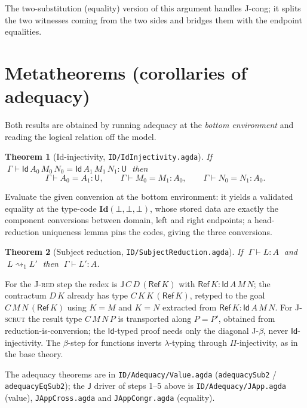 \documentclass[11pt]{article}
\newtheorem{theorem}{Theorem}
\newcommand{\ty}[3]{#1 \vdash #2 : #3}
\newcommand{\cv}[4]{#1 \vdash #2 = #3 : #4}
\newcommand{\U}{\mathsf{U}}
\newcommand{\Id}{\mathsf{Id}}
\newcommand{\Rf}{\mathsf{Ref}}
\newcommand{\Jelim}{\mathsf{J}}
\newcommand{\redone}{\rightsquigarrow_1}
\newcommand{\Ga}{\Gamma}
\newcommand{\cId}{\mathbf{Id}}
\begin{document}
\noindent
The two-substitution (equality) version of this argument handles J-cong; it
splits the two witnesses coming from the two sides and bridges them with the
endpoint equalities.

\section*{Metatheorems (corollaries of adequacy)}

Both results are obtained by running adequacy at the \emph{bottom environment}
and reading the logical relation off the model.

\begin{theorem}[Id-injectivity, \texttt{ID/IdInjectivity.agda}]
If $\;\cv{\Ga}{\Id\,A_0\,M_0\,N_0}{\Id\,A_1\,M_1\,N_1}{\U}\;$ then
\[
  \cv{\Ga}{A_0}{A_1}{\U},\qquad
  \cv{\Ga}{M_0}{M_1}{A_0},\qquad
  \cv{\Ga}{N_0}{N_1}{A_0}.
\]
\end{theorem}

\noindent
Evaluate the given conversion at the bottom environment: it yields a validated
equality at the type-code $\cId(\bot,\bot,\bot)$, whose stored data are exactly
the component conversions between domain, left and right endpoints; a
head-reduction uniqueness lemma pins the codes, giving the three conversions.

\begin{theorem}[Subject reduction, \texttt{ID/SubjectReduction.agda}]
If $\;\ty{\Ga}{L}{A}\;$ and $\;L \redone L'\;$ then $\;\ty{\Ga}{L'}{A}$.
\end{theorem}

\noindent
For the \textsc{J-red} step the redex is $\Jelim\,C\,D\,(\Rf\,K)$ with
$\Rf\,K:\Id\,A\,M\,N$; the contractum $D\,K$ already has type
$C\,K\,K\,(\Rf\,K)$, retyped to the goal $C\,M\,N\,(\Rf\,K)$ using $K=M$ and
$K=N$ extracted from $\Rf\,K:\Id\,A\,M\,N$. For \textsc{J-scrut} the result type
$C\,M\,N\,P$ is transported along $P=P'$, obtained from reduction-is-conversion;
the $\Id$-typed proof needs only the diagonal J-$\beta$, never
$\Id$-injectivity. The $\beta$-step for functions inverts $\lambda$-typing
through $\Pi$-injectivity, as in the base theory.

\medskip
\noindent
The adequacy theorems are in \texttt{ID/Adequacy/Value.agda}
(\texttt{adequacySub2} / \texttt{adequacyEqSub2}); the $\Jelim$ driver of steps
1--5 above is \texttt{ID/Adequacy/JApp.agda} (value), \texttt{JAppCross.agda}
and \texttt{JAppCongr.agda} (equality).
\end{document}
